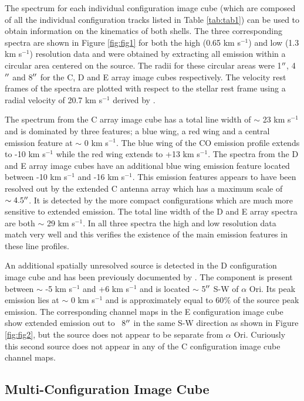 \documentclass[manuscript]{aastex}
\begin{document}
The spectrum for each individual configuration image cube (which are composed of all the individual configuration tracks listed in Table \ref{tab:tab1}) can be used to obtain information on the kinematics of both shells. The three corresponding spectra are shown in Figure \ref{fig:fig1} for both the high (0.65 km s${}^{-1}$) and low (1.3 km s${}^{-1}$) resolution data and were obtained by extracting all emission within a circular area centered on the source. The radii for these circular areas were 1$\mbox{$^{\prime\prime}$}$, 4$\mbox{$^{\prime\prime}$}$ and 8$\mbox{$^{\prime\prime}$}$ for the C, D and E array image cubes respectively. The velocity rest frames of the spectra are plotted with respect to the stellar rest frame using a radial velocity of 20.7 km s${}^{-1}$  derived by \citet{harp08} .

The spectrum from the C array image cube has a total line width of $\sim$ 23 km s${}^{-1}$ and is dominated by three features; a blue wing, a red wing and a central emission feature at $\sim$ 0 km s${}^{-1}$. The blue wing of the CO emission profile extends to -10 km s${}^{-1}$ while the red wing extends to +13 km s${}^{-1}$. The spectra from the D and E array image cubes have an additional blue wing emission feature located between -10 km s${}^{-1}$ and -16 km s${}^{-1}$. This emission features appears to have been resolved out by the extended C antenna array which has a maximum scale of $\sim 4.5 \mbox{$^{\prime\prime}$}$. It is detected by the more compact configurations which are much more sensitive to extended emission. The total line width of the D and E array spectra are both $\sim$ 29 km s${}^{-1}$. In all three spectra the high and low resolution data match very well and this verifies the existence of the main emission features in these line profiles.

An additional spatially unresolved source is detected in the D configuration image cube and has been previously documented by \citet{harp09}. The component is present between $\sim$ -5 km s${}^{-1}$ and +6 km s${}^{-1}$ and is located $\sim$ 5$\mbox{$^{\prime\prime}$}$ S-W of $\alpha$ Ori. Its peak emission lies at $\sim$ 0 km s${}^{-1}$ and is approximately equal to 60$\%$ of the source peak emission. The corresponding channel maps in the E configuration image cube show extended emission out to ~8$\mbox{$^{\prime\prime}$}$ in the same S-W direction as shown in Figure \ref{fig:fig2}, but the source does not appear to be separate from $\alpha$ Ori. Curiously this second source does not appear in any of the C configuration image cube channel maps. 


\subsection{Multi-Configuration Image Cube} \label{results2} 
\end{document}
